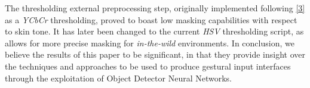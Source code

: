 \documentclass[a4paper, 12pt]{article}
\begin{document}
\begin{flushleft}
The thresholding external preprocessing step, originally implemented following \hyperref[Ref0]{[3]} as a \textit{YCbCr} thresholding, proved to boast low masking capabilities with respect to skin tone. It has later been changed to the current \textit{HSV} thresholding script, as allows for more precise masking for \textit{in-the-wild} environments.\linebreak
In conclusion, we believe the results of this paper to be significant, in that they provide insight over the techniques and approaches to be used to produce gestural input interfaces through the exploitation of Object Detector Neural Networks.\linebreak

\end{flushleft}

\onecolumn
\end{document}
